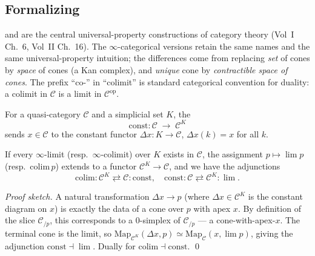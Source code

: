 \subsection{Formalizing}

\begin{nameorigin}
 and  are the central universal-property
constructions of category theory (Vol~I Ch.~6, Vol~II Ch.~16). The
$\infty$-categorical versions retain the same names and the same
universal-property intuition; the differences come from replacing
\emph{set} of cones by \emph{space} of cones (a Kan complex), and
\emph{unique} cone by \emph{contractible space of cones}. The
prefix ``co-'' in ``colimit'' is standard categorical convention for
duality: a colimit in $\mathcal{C}$ is a limit in $\mathcal{C}^{\mathrm{op}}$.
\end{nameorigin}

\begin{definition}
\label{def:constant-diagram}
For a quasi-category $\mathcal{C}$ and a simplicial set $K$, the
\begin{equation*}
  \mathrm{const} : \mathcal{C} \;\longrightarrow\; \mathcal{C}^K
\end{equation*}
sends $x \in \mathcal{C}$ to the constant functor $\Delta x : K \to
\mathcal{C}$, $\Delta x(k) = x$ for all $k$.
\end{definition}

\begin{theorem}
\label{thm:limits-as-adjoints}
If every $\infty$-limit (resp.\ $\infty$-colimit) over $K$ exists in
$\mathcal{C}$, the assignment $p \mapsto \lim p$ (resp.\ $\mathrm{colim}\, p$)
extends to a functor $\mathcal{C}^K \to \mathcal{C}$, and we have the
adjunctions
\begin{equation*}
  \mathrm{colim} : \mathcal{C}^K \rightleftarrows \mathcal{C} : \mathrm{const}, \quad
  \mathrm{const} : \mathcal{C} \rightleftarrows \mathcal{C}^K : \lim.
\end{equation*}
\end{theorem}

\begin{proof}[Proof sketch]
A natural transformation $\Delta x \to p$ (where $\Delta x \in \mathcal{C}^K$
is the constant diagram on $x$) is exactly the data of a cone over $p$
with apex $x$. By definition of the slice $\mathcal{C}_{/p}$, this
corresponds to a $0$-simplex of $\mathcal{C}_{/p}$ — a cone-with-apex-$x$.
The terminal cone is the limit, so $\mathrm{Map}_{\mathcal{C}^K}(\Delta x, p)
\simeq \mathrm{Map}_\mathcal{C}(x, \lim p)$, giving the adjunction
$\mathrm{const} \dashv \lim$. Dually for $\mathrm{colim} \dashv \mathrm{const}$. \qed
\end{proof}

